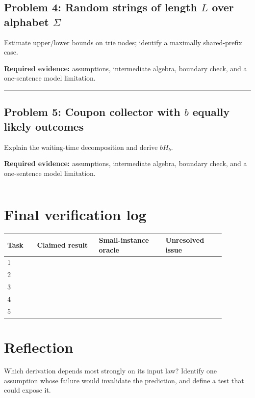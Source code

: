 \documentclass[11pt]{article}
\begin{document}
\subsection{\texorpdfstring{Problem 4: Random strings of length $L$ over alphabet $\Sigma$}{Problem 4: Random strings of length L over alphabet Sigma}}
Estimate upper/lower bounds on trie nodes; identify a maximally shared-prefix case.\par
\textbf{Required evidence:} assumptions, intermediate algebra, boundary check, and a one-sentence model limitation.\par
\vspace{1.2cm}\hrule\vspace{0.4cm}
\subsection{\texorpdfstring{Problem 5: Coupon collector with $b$ equally likely outcomes}{Problem 5: Coupon collector with b equally likely outcomes}}
Explain the waiting-time decomposition and derive $bH_b$.\par
\textbf{Required evidence:} assumptions, intermediate algebra, boundary check, and a one-sentence model limitation.\par
\vspace{1.2cm}\hrule\vspace{0.4cm}
\section{Final verification log}
\begin{longtable}{p{0.12\linewidth}p{0.25\linewidth}p{0.27\linewidth}p{0.24\linewidth}}\toprule Task & Claimed result & Small-instance oracle & Unresolved issue \\ \midrule
1 & & & \\ 2 & & & \\ 3 & & & \\ 4 & & & \\ 5 & & & \\ \bottomrule\end{longtable}
\section{Reflection}
Which derivation depends most strongly on its input law? Identify one assumption whose failure would invalidate the prediction, and define a test that could expose it.
\end{document}
